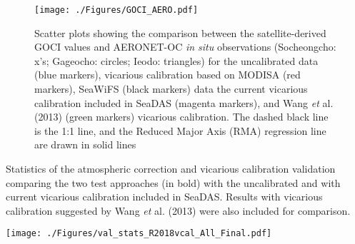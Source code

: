 \documentclass[10pt]{article}
\begin{document}
\begin{figure}[htbp!]
  \centering
    \texttt{[image: ./Figures/GOCI\_AERO.pdf]}

    \caption{Scatter plots showing the comparison between the satellite-derived GOCI values and AERONET-OC {\it in situ} observations (Socheongcho: x's; Gageocho: circles; Ieodo: triangles) for the uncalibrated data (blue markers), vicarious calibration based on MODISA (red markers), SeaWiFS (black markers) data the current vicarious calibration included in SeaDAS (magenta markers), and Wang {\it et} al. (2013) \cite{Wang:13} (green markers) vicarious calibration. The dashed black line is the 1:1 line, and the Reduced Major Axis (RMA) regression line are drawn in solid lines \label{fig:GOCI_AERO} } 
\end{figure}
\begin{table}[H]
\caption{Statistics of the atmospheric correction and vicarious calibration validation comparing the two test approaches (in bold) with the uncalibrated and with current vicarious calibration included in SeaDAS. Results with vicarious calibration suggested by Wang {\it et} al. (2013) \cite{Wang:13} were also included for comparison. \label{tab:val_stats} }

  \centering
    \texttt{[image: ./Figures/val\_stats\_R2018vcal\_All\_Final.pdf]}

\end{table}
\end{document}
